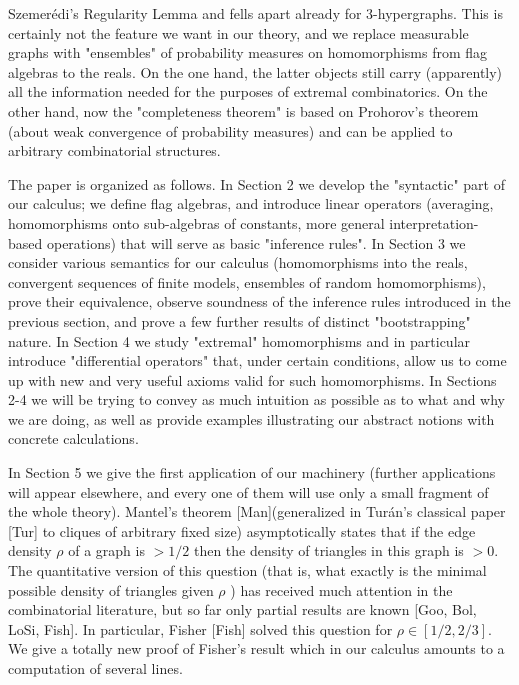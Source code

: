 \documentclass[10pt]{article}
\begin{document}
\begin{displayquote}
Szemerédi's Regularity Lemma and fells apart already for 3-hypergraphs. This is certainly not the feature we want in our theory, and we replace measurable graphs with "ensembles" of probability measures on homomorphisms from flag algebras to the reals. On the one hand, the latter objects still carry (apparently) all the information needed for the purposes of extremal combinatorics. On the other hand, now the "completeness theorem" is based on Prohorov's theorem (about weak convergence of probability measures) and can be applied to arbitrary combinatorial structures.
\end{displayquote}

The paper is organized as follows. In Section 2 we develop the "syntactic" part of our calculus; we define flag algebras, and introduce linear operators (averaging, homomorphisms onto sub-algebras of constants, more general interpretation-based operations) that will serve as basic "inference rules". In Section 3 we consider various semantics for our calculus (homomorphisms into the reals, convergent sequences of finite models, ensembles of random homomorphisms), prove their equivalence, observe soundness of the inference rules introduced in the previous section, and prove a few further results of distinct "bootstrapping" nature. In Section 4 we study "extremal" homomorphisms and in particular introduce "differential operators" that, under certain conditions, allow us to come up with new and very useful axioms valid for such homomorphisms. In Sections 2-4 we will be trying to convey as much intuition as possible as to what and why we are doing, as well as provide examples illustrating our abstract notions with concrete calculations.

In Section 5 we give the first application of our machinery (further applications will appear elsewhere, and every one of them will use only a small fragment of the whole theory). Mantel's theorem [Man](generalized in Turán's classical paper [Tur] to cliques of arbitrary fixed size) asymptotically states that if the edge density $\rho$ of a graph is $>1 / 2$ then the density of triangles in this graph is $>0$. The quantitative version of this question (that is, what exactly is the minimal possible density of triangles given $\rho$ ) has received much attention in the combinatorial literature, but so far only partial results are known [Goo, Bol, LoSi, Fish]. In particular, Fisher [Fish] solved this question for $\rho \in[1 / 2,2 / 3]$. We give a totally new proof of Fisher's result which in our calculus amounts to a computation of several lines.
\end{document}
